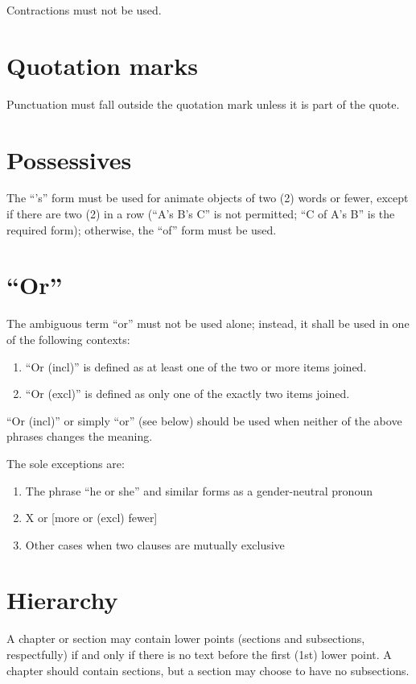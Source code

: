 \documentclass[10pt]{book}
\begin{document}
Contractions must not be used.

\section{Quotation marks}

Punctuation must fall outside the quotation mark unless it is part of the quote.

\section{Possessives}

The ``'s'' form must be used for animate objects of two (2) words or fewer, except if there are two (2) in a row (``A's B's C'' is not permitted; ``C of A's B'' is the required form); otherwise, the ``of'' form must be used.

\section{``Or''}

The ambiguous term ``or'' must not be used alone; instead, it shall be used in one of the following contexts:

\begin{enumerate}
 \item ``Or (incl)'' is defined as at least one of the two or more items joined.
 \item ``Or (excl)'' is defined as only one of the exactly two items joined.
\end{enumerate}

``Or (incl)'' or simply ``or'' (see below) should be used when neither of the above phrases changes the meaning.

The sole exceptions are:
\begin{enumerate}
 \item The phrase ``he or she'' and similar forms as a gender-neutral pronoun
 \item X or [more or (excl) fewer]
 \item Other cases when two clauses are mutually exclusive
\end{enumerate}

\section{Hierarchy}

A chapter or section may contain lower points (sections and subsections, respectfully) if and only if there is no text before the first (1st) lower point. A chapter should contain sections, but a section may choose to have no subsections.
\end{document}
